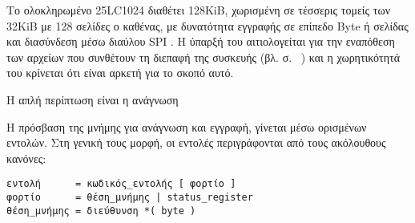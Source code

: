 Το ολοκληρωμένο 25LC1024 διαθέτει 128KiB, χωρισμένη σε τέσσερις τομείς των 32KiB
με 128 σελίδες ο καθένας, με δυνατότητα εγγραφής σε επίπεδο Byte ή σελίδας και
διασύνδεση μέσω διαύλου SPI \parencite[1]{25lc1024}.
Η ύπαρξή του αιτιολογείται για την εναπόθεση των αρχείων που συνθέτουν τη
διεπαφή της συσκευής (βλ.  σ.~%
\pageref{subsec:network:files}) και η χωρητικότητά του κρίνεται ότι είναι αρκετή
για το σκοπό αυτό.




Η απλή περίπτωση είναι η ανάγνωση 

Η πρόσβαση της μνήμης για ανάγνωση και εγγραφή, γίνεται μέσω ορισμένων εντολών.
Στη γενική τους μορφή, οι εντολές περιγράφονται από τους ακόλουθους κανόνες:
\begin{lstlisting}
εντολή      = κωδικός_εντολής [ φορτίο ]
φορτίο      = θέση_μνήμης | status_register
θέση_μνήμης = διεύθυνση *( byte )
\end{lstlisting}

%

%




